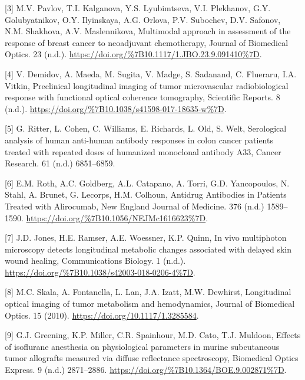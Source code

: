 \documentclass[
]{article}
\begin{document}
\leavevmode\hypertarget{ref-pavlov2018}{}%
{[}3{]} M.V. Pavlov, T.I. Kalganova, Y.S. Lyubimtseva, V.I. Plekhanov, G.Y. Golubyatnikov, O.Y. Ilyinskaya, A.G. Orlova, P.V. Subochev, D.V. Safonov, N.M. Shakhova, A.V. Maslennikova, Multimodal approach in assessment of the response of breast cancer to neoadjuvant chemotherapy, Journal of Biomedical Optics. 23 (n.d.). \url{https://doi.org/\%7B10.1117/1.JBO.23.9.091410\%7D}.

\leavevmode\hypertarget{ref-demidov2018}{}%
{[}4{]} V. Demidov, A. Maeda, M. Sugita, V. Madge, S. Sadanand, C. Flueraru, I.A. Vitkin, Preclinical longitudinal imaging of tumor microvascular radiobiological response with functional optical coherence tomography, Scientific Reports. 8 (n.d.). \url{https://doi.org/\%7B10.1038/s41598-017-18635-w\%7D}.

\leavevmode\hypertarget{ref-ritter2001}{}%
{[}5{]} G. Ritter, L. Cohen, C. Williams, E. Richards, L. Old, S. Welt, Serological analysis of human anti-human antibody responses in colon cancer patients treated with repeated doses of humanized monoclonal antibody A33, Cancer Research. 61 (n.d.) 6851--6859.

\leavevmode\hypertarget{ref-roth2017}{}%
{[}6{]} E.M. Roth, A.C. Goldberg, A.L. Catapano, A. Torri, G.D. Yancopoulos, N. Stahl, A. Brunet, G. Lecorps, H.M. Colhoun, Antidrug Antibodies in Patients Treated with Alirocumab, New England Journal of Medicine. 376 (n.d.) 1589--1590. \url{https://doi.org/\%7B10.1056/NEJMc1616623\%7D}.

\leavevmode\hypertarget{ref-jones2018}{}%
{[}7{]} J.D. Jones, H.E. Ramser, A.E. Woessner, K.P. Quinn, In vivo multiphoton microscopy detects longitudinal metabolic changes associated with delayed skin wound healing, Communications Biology. 1 (n.d.). \url{https://doi.org/\%7B10.1038/s42003-018-0206-4\%7D}.

\leavevmode\hypertarget{ref-skala2010}{}%
{[}8{]} M.C. Skala, A. Fontanella, L. Lan, J.A. Izatt, M.W. Dewhirst, Longitudinal optical imaging of tumor metabolism and hemodynamics, Journal of Biomedical Optics. 15 (2010). \url{https://doi.org/10.1117/1.3285584}.

\leavevmode\hypertarget{ref-greening2018}{}%
{[}9{]} G.J. Greening, K.P. Miller, C.R. Spainhour, M.D. Cato, T.J. Muldoon, Effects of isoflurane anesthesia on physiological parameters in murine subcutaneous tumor allografts measured via diffuse reflectance spectroscopy, Biomedical Optics Express. 9 (n.d.) 2871--2886. \url{https://doi.org/\%7B10.1364/BOE.9.002871\%7D}.
\end{document}
